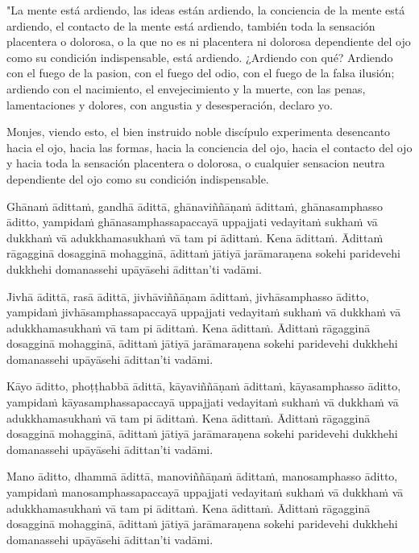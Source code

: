 "La mente está ardiendo, las ideas están ardiendo, la conciencia de la mente está ardiendo, el contacto de la mente está ardiendo, también toda la sensación placentera o dolorosa, o la que no es ni placentera ni dolorosa dependiente del ojo como su condición indispensable, está ardiendo. ¿Ardiendo con qué? Ardiendo con el fuego de la pasion, con el fuego del odio, con el fuego de la falsa ilusión; ardiendo con el nacimiento, el envejecimiento y la muerte, con las penas, lamentaciones y dolores, con angustia y desesperación, declaro yo.

Monjes, viendo esto, el bien instruido noble discípulo experimenta desencanto hacia el ojo, hacia las formas, hacia la conciencia del ojo, hacia el contacto del ojo y hacia toda la sensación placentera o dolorosa, o cualquier sensacion neutra dependiente del ojo como su condición indispensable. 



\clearpage

\paliText
\markboth{\paliTitle}{\rightmark}

Ghānaṁ ādittaṁ, gandhā ādittā, ghānaviññāṇaṁ ādittaṁ, ghānasamphasso
āditto, yampidaṁ ghānasamphassapaccayā uppajjati vedayitaṁ sukhaṁ vā
dukkhaṁ vā adukkhamasukhaṁ vā tam pi ādittaṁ. Kena ādittaṁ. Ādittaṁ
rāgagginā dosagginā mohagginā, ādittaṁ jātiyā jarāmaraṇena sokehi
paridevehi dukkhehi domanassehi upāyāsehi ādittan'ti vadāmi.

Jivhā ādittā, rasā ādittā, jivhāviññāṇam ādittaṁ, jivhāsamphasso āditto,
yampidaṁ jivhāsamphassapaccayā uppajjati vedayitaṁ sukhaṁ vā dukkhaṁ vā
adukkhamasukhaṁ vā tam pi ādittaṁ. Kena ādittaṁ. Ādittaṁ rāgagginā
dosagginā mohagginā, ādittaṁ jātiyā jarāmaraṇena sokehi paridevehi
dukkhehi domanassehi upāyāsehi ādittan'ti vadāmi.

Kāyo āditto, phoṭṭhabbā ādittā, kāyaviññāṇaṁ ādittaṁ, kāyasamphasso
āditto, yampidaṁ kāyasamphassapaccayā uppajjati vedayitaṁ sukhaṁ vā
dukkhaṁ vā adukkhamasukhaṁ vā tam pi ādittaṁ. Kena ādittaṁ. Ādittaṁ
rāgagginā dosagginā mohagginā, ādittaṁ jātiyā jarāmaraṇena sokehi
paridevehi dukkhehi domanassehi upāyāsehi ādittan'ti vadāmi.

Mano āditto, dhammā ādittā, manoviññāṇaṁ ādittaṁ, manosamphasso āditto,
yampidaṁ manosamphassapaccayā uppajjati vedayitaṁ sukhaṁ vā dukkhaṁ vā
adukkhamasukhaṁ vā tam pi ādittaṁ. Kena ādittaṁ. Ādittaṁ rāgagginā
dosagginā mohagginā, ādittaṁ jātiyā jarāmaraṇena sokehi paridevehi
dukkhehi domanassehi upāyāsehi ādittan'ti vadāmi.

\enlargethispage{2\baselineskip}

